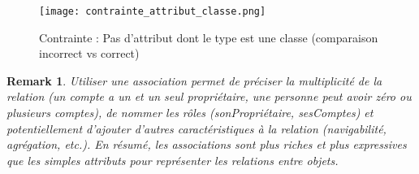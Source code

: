 \documentclass{article}
\newtheorem{remark}{Remark}
\begin{document}
\begin{figure}[H]
    \centering
    \texttt{[image: contrainte\_attribut\_classe.png]}
    \caption{Contrainte : Pas d'attribut dont le type est une classe (comparaison incorrect vs correct)}
    \label{fig:contrainte_attribut_classe}
\end{figure}

\begin{remark}
Utiliser une association permet de préciser la multiplicité de la relation (un compte a un et un seul propriétaire, une personne peut avoir zéro ou plusieurs comptes), de nommer les rôles (sonPropriétaire, sesComptes) et potentiellement d'ajouter d'autres caractéristiques à la relation (navigabilité, agrégation, etc.).  En résumé, les associations sont plus riches et plus expressives que les simples attributs pour représenter les relations entre objets.
\end{remark}
\end{document}
